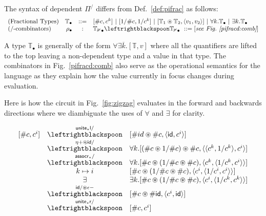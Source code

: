 \documentclass[a4paper,USenglish]{lipics-v2016-utf8x}
\newcommand{\hash}{\#}
\newcommand{\alt}{~|~}
\newcommand{\order}[1]{\hash #1}
\newcommand{\iorder}[1]{1/\hash #1}
\newcommand{\synch}{\mathsf{{synch}}}
\newcommand{\unitetl}{\mathsf{{unite_{\star}l}}}
\newcommand{\unitetr}{\mathsf{{unite_{\star}r}}}
\newcommand{\assocrt}{\mathsf{{assocr_{\star}}}}
\newcommand{\idiso}{\mathsf{{id}}}
\begin{document}
\begin{definition}[Dependent $\Pi^/$]
\label{def:pifracd}
The syntax of dependent $\Pi^/$ differs from Def.~\ref{def:pifrac} as follows:
\[\begin{array}{lrcl}
(\textrm{Fractional Types}) & \mathbb{T_\bullet} &::=&
  [\order{c},c^k] \alt
  [\iorder{c},1/c^k] \alt
  [\mathbb{T}_1 \circledast \mathbb{T}_2,\langle v_1,v_2 \rangle] \alt
  \forall k.\mathbb{T_\bullet} \alt \exists k.\mathbb{T_\bullet} \\
 (\textrm{/-combinators}) & \rho_\bullet &:&
  \mathbb{T_1}_{\bullet} \leftrightblackspoon \mathbb{T_2}_{\bullet} ~::=
  [\textit{see Fig.~\ref{pifracd:comb}}]
\end{array}\]
\end{definition}

A type $\mathbb{T}_\bullet$ is generally of the form
$\forall\exists{\overline{k}}.[\mathbb{T},v]$ where all the quantifiers are
lifted to the top leaving a non-dependent type and a value in that type. The
combinators in Fig.~\ref{pifracd:comb} also serve as the operational semantics
for the language as they explain how the value currently in focus changes during
evaluation.

Here is how the circuit in Fig.~\ref{fig:zigzag} evaluates in the forward and
backwards directions where we diambiguate the uses of $\forall$ and $\exists$
for clarity.

\[\begin{array}{rcl}
[\order{c},c^i]
&\stackrel{\unitetl/}{\leftrightblackspoon}&
  [\order{id}\circledast\order{c}, \langle \idiso,c^i \rangle] \\
&\stackrel{\eta+\circledast\idiso/}{\leftrightblackspoon}&
  \forall{k}.[(\order{c}\circledast\iorder{c})\circledast\order{c},
  \langle \langle c^k,1/c^k \rangle,c^i \rangle] \\
&\stackrel{\assocrt/}{\leftrightblackspoon}&
  \forall{k}.[\order{c}\circledast(\iorder{c}\circledast\order{c}),
  \langle c^k, \langle 1/c^k,c^i \rangle\rangle] \\
&k\mapsto i&
  [\order{c}\circledast(\iorder{c}\circledast\order{c}),
  \langle c^i, \langle 1/c^i,c^i \rangle\rangle] \\
&\exists&
  \exists{k}.[\order{c}\circledast(\iorder{c}\circledast\order{c}),
  \langle c^i, \langle 1/c^k,c^k \rangle\rangle] \\
&\stackrel{\idiso/\circledast\epsilon-}{\leftrightblackspoon}&
  [\order{c}\circledast\order{\idiso},
  \langle c^i, \idiso \rangle] \\
&\stackrel{\unitetr/}{\leftrightblackspoon}&
  [\order{c}, c^i]
\end{array}\]
\end{document}
